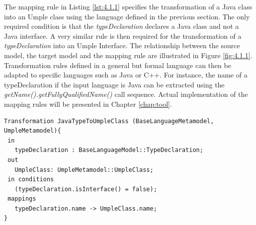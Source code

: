 The mapping rule in Listing \ref{lst:4.1.1} specifies the transformation of a Java class into an Umple class using the language defined in the previous section. The only required condition is that the \textit{typeDeclaration} declares a Java class and not a Java interface. A very similar rule is then required for the transformation of a \textit{typeDeclaration} into an Umple Interface. The relationship between the source model, the target model and the mapping rule are illustrated in Figure \ref{fig:4.1.1}. Transformation rules defined in a general but formal language can then be adapted to specific languages such as Java or C++. For instance, the name of a typeDeclaration if the input language is Java can be extracted using the \textit{getName().getFullyQualifiedName()} call sequence. Actual implementation of the mapping rules will be presented in Chapter \ref{chap:tool}.




\begin{lstlisting}[style=mine,caption=Rule JavaTypeToUmpleClass,label=lst:4.1.1]
Transformation JavaTypeToUmpleClass (BaseLanguageMetamodel, UmpleMetamodel){ 
 in
   typeDeclaration : BaseLanguageModel::TypeDeclaration;
 out
   UmpleClass: UmpleMetamodel::UmpleClass;
 in conditions
   (typeDeclaration.isInterface() = false);
 mappings
   typeDeclaration.name -> UmpleClass.name;
}
\end{lstlisting}

